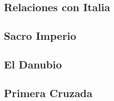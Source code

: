 \subsection{Relaciones con Italia}


\subsection{Sacro Imperio}


\subsection{El Danubio}


\subsection{Primera Cruzada}


